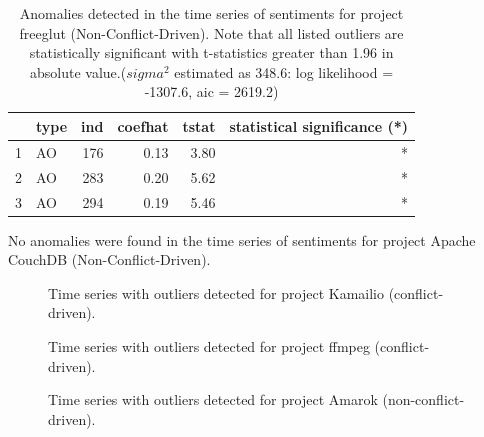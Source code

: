 \documentclass[12pt,letterpaper]{gthesis2}  %
\begin{document}
\begin{table}
\centering
\caption{Anomalies detected in the time series of sentiments for project freeglut (Non-Conflict-Driven). Note that all listed outliers are statistically significant with t-statistics greater than 1.96 in absolute value.($sigma^2$ estimated as 348.6:  log likelihood = -1307.6,  aic = 2619.2)}
\begin{tabular}{rlrrrr}
  \hline
 & type & ind & coefhat & tstat & statistical significance (*)\\ 
  \hline
1 & AO & 176 & 0.13 & 3.80  & *\\ 
  2 & AO & 283 & 0.20 & 5.62  & *\\ 
  3 & AO & 294 & 0.19 & 5.46  & *\\ 
   \hline
\end{tabular}
\end{table}


%
%

No anomalies were found in the time series of sentiments for project Apache CouchDB (Non-Conflict-Driven). \\

\begin{figure}
\centering
{}
\caption{Time series with outliers detected for project Kamailio (conflict-driven).}
\label{figureOutliers_1}
\end{figure}


\begin{figure}
\centering
{}
\caption{Time series with outliers detected for project ffmpeg (conflict-driven).}
\label{figureOutliers_2}
\end{figure}

\begin{figure}
\centering
{}
\caption{Time series with outliers detected for project Amarok (non-conflict-driven).}
\label{figureOutliers_3}
\end{figure}
\end{document}
